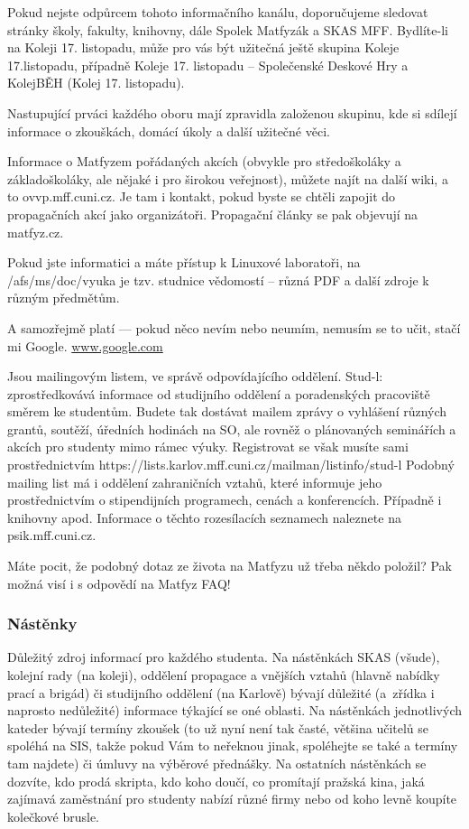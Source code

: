 Pokud nejste odpůrcem tohoto informačního kanálu, doporučujeme sledovat stránky školy, fakulty, knihovny, dále Spolek
Matfyzák a SKAS MFF. Bydlíte-li na Koleji 17. listopadu, může pro vás být užitečná ještě skupina Koleje 17.listopadu,
případně Koleje 17. listopadu – Společenské Deskové Hry a KolejBĚH (Kolej 17. listopadu).

Nastupující prváci každého oboru mají zpravidla založenou skupinu, kde si sdílejí informace o zkouškách, domácí úkoly a
další užitečné věci.

Informace o Matfyzem pořádaných akcích (obvykle pro středoškoláky a základoškoláky, ale nějaké i pro širokou veřejnost),
můžete najít na další wiki, a to ovvp.mff.cuni.cz. Je tam i kontakt, pokud byste se chtěli zapojit do propagačních akcí
jako organizátoři. Propagační články se pak objevují na matfyz.cz.

Pokud jste informatici a máte přístup k Linuxové laboratoři, na /afs/ms/doc/vyuka je tzv. studnice vědomostí – různá PDF
a další zdroje k různým předmětům.

A samozřejmě platí --- pokud něco nevím nebo neumím, nemusím se to učit, stačí mi Google. \url{www.google.com}

Jsou mailingovým listem, ve správě odpovídajícího oddělení. Stud-l: zprostředkovává informace od studijního oddělení a
poradenských pracoviště směrem ke studentům. Budete tak dostávat mailem zprávy o vyhlášení různých grantů, soutěží,
úředních hodinách na SO, ale rovněž o plánovaných seminářích a akcích pro studenty mimo rámec výuky. Registrovat se však
musíte sami prostřednictvím https://lists.karlov.mff.cuni.cz/mailman/listinfo/stud-l Podobný mailing list má i oddělení
zahraničních vztahů, které informuje jeho prostřednictvím o stipendijních programech, cenách a konferencích. Případně i
knihovny apod. Informace o těchto rozesílacích seznamech naleznete na psik.mff.cuni.cz.

Máte pocit, že podobný dotaz ze života na Matfyzu už třeba někdo položil? Pak možná visí i s odpovědí na Matfyz FAQ!


\subsubsection{Nástěnky}
Důležitý zdroj informací pro každého studenta. Na nástěnkách SKAS
(všude), kolejní rady (na koleji), oddělení propagace a vnějších
vztahů (hlavně nabídky prací a brigád) či studijního oddělení (na
Karlově) bývají důležité (a~zřídka i naprosto nedůležité)
informace týkající se oné oblasti. Na nástěnkách jednotlivých
kateder bývají termíny zkoušek (to už nyní není tak časté, většina
učitelů se spoléhá na SIS, takže pokud Vám to neřeknou jinak,
spoléhejte se také a termíny tam najdete) či úmluvy na výběrové
přednášky. Na ostatních nástěnkách se dozvíte, kdo prodá skripta,
kdo koho doučí, co promítají pražská kina, jaká zajímavá
zaměstnání pro studenty nabízí různé firmy nebo od koho levně
koupíte kolečkové brusle.


